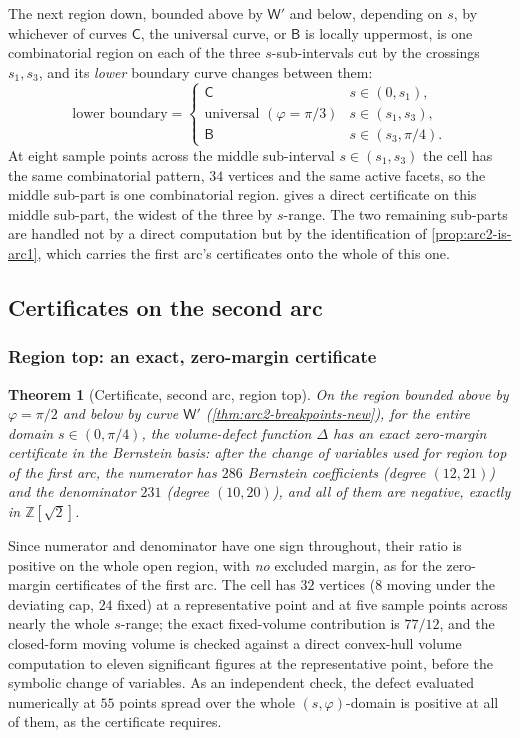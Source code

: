 \documentclass[11pt,reqno]{amsart}
\renewcommand{\_}{\origunderscore\allowbreak}
\numberwithin{equation}{section}
\theoremstyle{plain}
\newtheorem{thm}{Theorem}[section]
\theoremstyle{definition}
\theoremstyle{remark}
\newcommand{\tilt}{\varphi}                  %
\newcommand{\arcp}{s}                        %
\newcommand{\defect}{\Delta}                 %
\begin{document}
The next region down, bounded above by $\mathsf W'$ and below,
depending on $\arcp$, by whichever of curves $\mathsf C$, the universal
curve, or $\mathsf B$ is locally uppermost, is one combinatorial region
on each of the three $\arcp$-sub-intervals cut by the crossings
$\arcp_1,\arcp_3$, and its \emph{lower} boundary curve changes between
them:
\[
  \text{lower boundary} = \begin{cases}
    \mathsf C & \arcp\in(0,\arcp_1),\\
    \text{universal } (\tilt=\pi/3) & \arcp\in(\arcp_1,\arcp_3),\\
    \mathsf B & \arcp\in(\arcp_3,\pi/4).
  \end{cases}
\]
At eight sample points across the middle sub-interval
$\arcp\in(\arcp_1,\arcp_3)$ the cell has the same combinatorial pattern,
$34$ vertices and the same active facets, so the middle sub-part is one
combinatorial region.
 gives a direct certificate on this middle
sub-part, the widest of the three by $\arcp$-range. The two remaining
sub-parts are handled not by a direct computation but by the
identification of \cref{prop:arc2-is-arc1}, which carries the first
arc's certificates onto the whole of this one.

\subsection{Certificates on the second arc}\label{sec:arc2-cert}

\subsubsection{Region top: an exact, zero-margin certificate}\label{sec:arc2-regiontop-new}

\begin{thm}[Certificate, second arc, region top]\label{thm:arc2-regiontop-new}
On the region bounded above by $\tilt=\pi/2$ and below by curve
$\mathsf W'$ (\cref{thm:arc2-breakpoints-new}), for the entire domain
$\arcp\in(0,\pi/4)$, the volume-defect function $\defect$ has an exact
zero-margin certificate in the Bernstein basis: after the change of
variables used for region top of the first arc, the numerator has $286$
Bernstein coefficients (degree $(12,21)$) and the denominator $231$
(degree $(10,20)$), and all of them are negative, exactly in
$\mathbb{Z}[\sqrt2]$.
\end{thm}

Since numerator and denominator have one sign throughout, their ratio
is positive on the whole open region, with \emph{no} excluded margin, as
for the zero-margin certificates of the first arc. The cell has $32$
vertices ($8$ moving under the deviating cap, $24$ fixed) at a
representative point and at five sample points across nearly the whole
$\arcp$-range; the exact
fixed-volume contribution is $77/12$, and the closed-form moving volume
is checked against a direct convex-hull volume computation to eleven
significant figures at the representative point, before the symbolic
change of variables. As an independent check, the defect evaluated
numerically at $55$ points spread over the whole $(\arcp,\tilt)$-domain
is positive at all of them, as the certificate requires.
\end{document}
